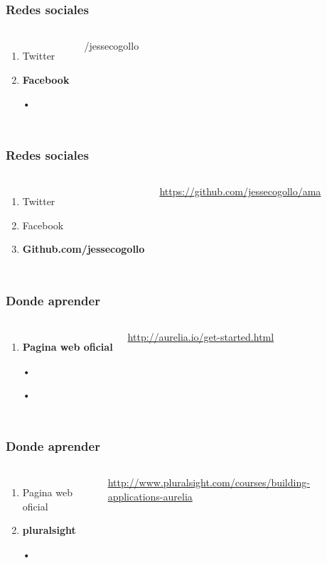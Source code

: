 \documentclass{beamer}
\begin{document}
\begin{frame}
\frametitle{Redes sociales}
\begin{columns}[c]
\begin{enumerate}
\item Twitter
\item \textbf{Facebook}
\item[•]
\end{enumerate}
{\color{blue}/jessecogollo}
\end{columns}
\end{frame}
\begin{frame}
\frametitle{Redes sociales}
\begin{columns}[c]
\begin{enumerate}
\item Twitter
\item Facebook
\item \textbf{Github.com/jessecogollo}
\end{enumerate}
{\color{blue}\url{https://github.com/jessecogollo/ama}}
\end{columns}
\end{frame}
\begin{frame}
\frametitle{Donde aprender}
\begin{columns}[c]
\begin{enumerate}
\item \textbf{Pagina web oficial}
\item[•]
\item[•]
\end{enumerate}
{\color{blue}\url{http://aurelia.io/get-started.html}}
\end{columns}
\end{frame}
\begin{frame}
\frametitle{Donde aprender}
\begin{columns}[c]
\begin{enumerate}
\item Pagina web oficial
\item \textbf{pluralsight}
\item[•]
\end{enumerate}
{\color{blue}\url{http://www.pluralsight.com/courses/building-applications-aurelia}}
\end{columns}
\end{frame}
\end{document}
